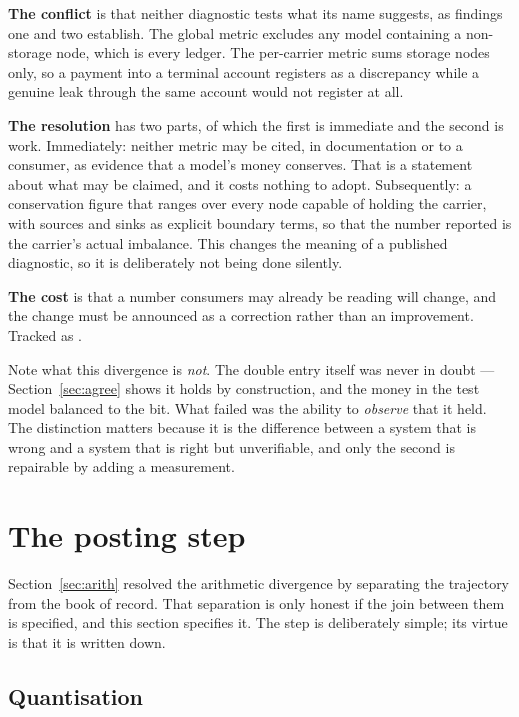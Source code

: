\documentclass[11pt,a4paper]{article}
\begin{document}
\textbf{The conflict} is that neither diagnostic tests what its name suggests, as findings one and two establish. The global metric excludes any model containing a non-storage node, which is every ledger. The per-carrier metric sums storage nodes only, so a payment into a terminal account registers as a discrepancy while a genuine leak through the same account would not register at all.

\textbf{The resolution} has two parts, of which the first is immediate and the second is work. Immediately: neither metric may be cited, in documentation or to a consumer, as evidence that a model's money conserves. That is a statement about what may be claimed, and it costs nothing to adopt. Subsequently: a conservation figure that ranges over every node capable of holding the carrier, with sources and sinks as explicit boundary terms, so that the number reported is the carrier's actual imbalance. This changes the meaning of a published diagnostic, so it is deliberately not being done silently.

\textbf{The cost} is that a number consumers may already be reading will change, and the change must be announced as a correction rather than an improvement. Tracked as .

Note what this divergence is \emph{not}. The double entry itself was never in doubt --- Section~\ref{sec:agree} shows it holds by construction, and the money in the test model balanced to the bit. What failed was the ability to \emph{observe} that it held. The distinction matters because it is the difference between a system that is wrong and a system that is right but unverifiable, and only the second is repairable by adding a measurement.

\section{The posting step}
\label{sec:posting}

Section~\ref{sec:arith} resolved the arithmetic divergence by separating the trajectory from the book of record. That separation is only honest if the join between them is specified, and this section specifies it. The step is deliberately simple; its virtue is that it is written down.

\subsection{Quantisation}
\end{document}
